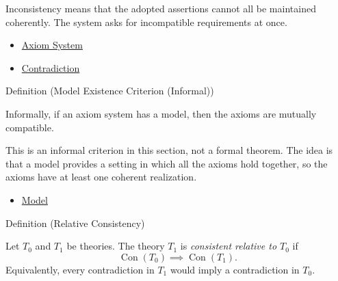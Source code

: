 \begin{remark*}[Interpretation]
Inconsistency means that the adopted assertions cannot all be maintained
coherently. The system asks for incompatible requirements at once.
\end{remark*}

\begin{dependencies}
\begin{itemize}
  \item \hyperref[def:axiom-system]{Axiom System}
  \item \hyperref[def:axiom-systems-contradiction]{Contradiction}
\end{itemize}
\end{dependencies}

\begin{definitionbox}{Definition (Model Existence Criterion (Informal))}
\begin{definition}
\label{def:axiom-systems-model-existence-criterion}
Informally, if an axiom system has a model, then the axioms are mutually
compatible.
\end{definition}
\end{definitionbox}

\begin{remark*}[Interpretation]
This is an informal criterion in this section, not a formal theorem. The idea
is that a model provides a setting in which all the axioms hold together, so
the axioms have at least one coherent realization.
\end{remark*}

\begin{dependencies}
\begin{itemize}
  \item \hyperref[def:axiom-systems-model]{Model}
\end{itemize}
\end{dependencies}

\begin{definitionbox}{Definition (Relative Consistency)}
\begin{definition}
\label{def:axiom-systems-relative-consistency}
Let $T_0$ and $T_1$ be theories. The theory $T_1$ is
\emph{consistent relative to $T_0$} if
\[
  \operatorname{Con}(T_0)\implies \operatorname{Con}(T_1).
\]
Equivalently, every contradiction in $T_1$ would imply a contradiction in
$T_0$.
\end{definition}
\end{definitionbox}

